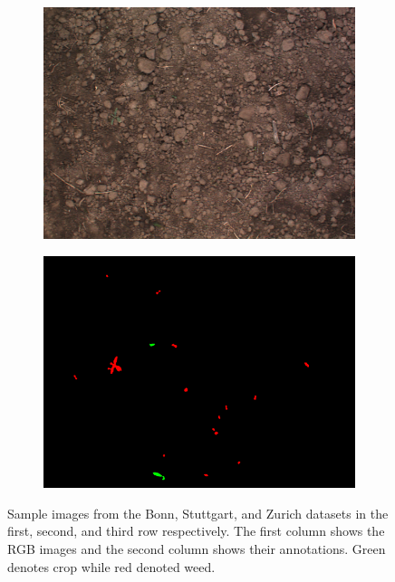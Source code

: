 \begin{figure}
\begin{subfigure}[b]{0.49\linewidth}
    \includegraphics[width=\linewidth]{pics/zurich/images/bonirob_2016-10-13-09-03-00_0_frame66.png}
   		\caption{}
		\label{zurich_img}    		
   \end{subfigure}
        \begin{subfigure}[b]{0.49\linewidth}
    \includegraphics[width=\linewidth]{pics/zurich/annotations/bonirob_2016-10-13-09-03-00_0_frame66.png}
   		\caption{}
		\label{zurich_lbl}    		
   \end{subfigure}
    \caption{Sample images from the Bonn, Stuttgart, and Zurich datasets in the first, second, and third row respectively. The first column shows the RGB images and the second column shows their annotations. Green denotes crop while red denoted weed.}
    \label{fig:datasets_images}
\end{figure}



